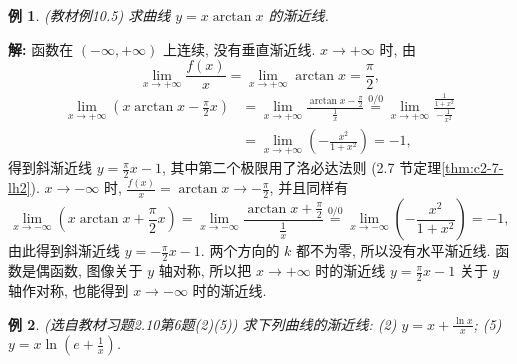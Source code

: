 \documentclass[UTF8,openany]{ctexbook}
\theoremstyle{chinesetextbook}
\newtheorem{example}{例}[section]
\newenvironment{cnsolution}{\par\indent\textbf{解:} \ignorespaces}{\par}
\begin{document}
\begin{example}\label{ex:c2-10-5}
\textnormal{(教材例10.5)} 求曲线 $y=x\arctan x$ 的渐近线.
\end{example}
\begin{cnsolution}
函数在 $(-\infty,+\infty)$ 上连续, 没有垂直渐近线. $x\to+\infty$ 时, 由
\[
\lim_{x\to+\infty}\frac{f(x)}x=\lim_{x\to+\infty}\arctan x=\frac\pi2,
\]
\[
\begin{aligned}
\lim_{x\to+\infty}\left(x\arctan x-\frac\pi2x\right)&=\lim_{x\to+\infty}\frac{\arctan x-\frac\pi2}{\frac1x}\overset{0/0}{=}\lim_{x\to+\infty}\frac{\frac1{1+x^2}}{-\frac1{x^2}}\\
&=\lim_{x\to+\infty}\left(-\frac{x^2}{1+x^2}\right)=-1,
\end{aligned}
\]
得到斜渐近线 $\displaystyle y=\frac\pi2x-1$, 其中第二个极限用了洛必达法则 (2.7 节定理\ref{thm:c2-7-lh2}). $x\to-\infty$ 时, $\displaystyle\frac{f(x)}x=\arctan x\to-\frac\pi2$, 并且同样有
\[
\lim_{x\to-\infty}\left(x\arctan x+\frac\pi2x\right)=\lim_{x\to-\infty}\frac{\arctan x+\frac\pi2}{\frac1x}\overset{0/0}{=}\lim_{x\to-\infty}\left(-\frac{x^2}{1+x^2}\right)=-1,
\]
由此得到斜渐近线 $\displaystyle y=-\frac\pi2x-1$. 两个方向的 $k$ 都不为零, 所以没有水平渐近线. 函数是偶函数, 图像关于 $y$ 轴对称, 所以把 $x\to+\infty$ 时的渐近线 $\displaystyle y=\frac\pi2x-1$ 关于 $y$ 轴作对称, 也能得到 $x\to-\infty$ 时的渐近线.
\end{cnsolution}
\begin{example}\label{ex:c2-h10-6}
\textnormal{(选自教材习题2.10第6题(2)(5))} 求下列曲线的渐近线: (2) $\displaystyle y=x+\frac{\ln x}x$; (5) $\displaystyle y=x\ln\left(e+\frac1x\right)$.
\end{example}
\end{document}
